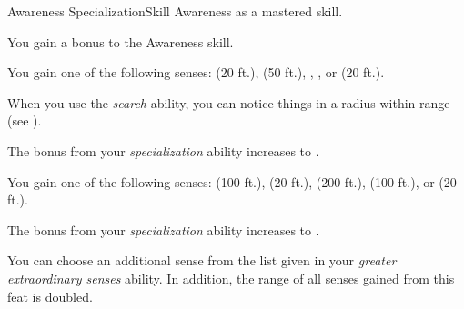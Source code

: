     \begin{feat}{Awareness Specialization}{Skill}
        \featpre Awareness as a mastered skill.

         You gain a  bonus to the Awareness skill.

         You gain one of the following senses:  (20 ft.),  (50 ft.), , , or  (20 ft.).

         When you use the \textit{search} ability, you can notice things in a \areasmall radius within \rngclose range (see ).

         The bonus from your \textit{specialization} ability increases to .

         You gain one of the following senses:  (100 ft.),  (20 ft.),  (200 ft.),  (100 ft.), or  (20 ft.).

         The bonus from your \textit{specialization} ability increases to .

         You can choose an additional sense from the list given in your \textit{greater extraordinary senses} ability.
        In addition, the range of all senses gained from this feat is doubled.
    \end{feat}

